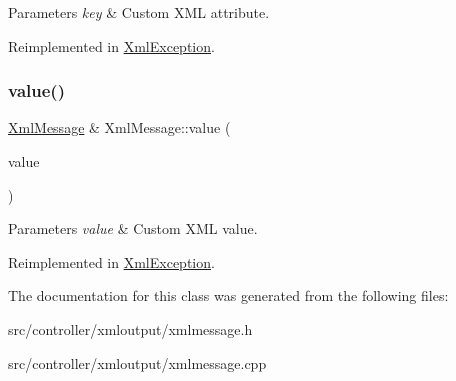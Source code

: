 \begin{DoxyParams}{Parameters}
{\em key} & Custom X\+ML attribute. \\
\hline
\end{DoxyParams}


Reimplemented in \hyperlink{classXmlException_a6a357f5a13ec354b84fb17ca5b5003a0}{Xml\+Exception}.

\mbox{\label{classXmlMessage_aef54b1b878c75f170139d1885597cb63}} 
\subsubsection{\texorpdfstring{value()}{value()}}
{\footnotesize\ttfamily \hyperlink{classXmlMessage}{Xml\+Message} \& Xml\+Message\+::value (\begin{DoxyParamCaption}\item[{const Q\+String \&}]{value }\end{DoxyParamCaption})\hspace{0.3cm}{\ttfamily [virtual]}}


\begin{DoxyParams}{Parameters}
{\em value} & Custom X\+ML value. \\
\hline
\end{DoxyParams}


Reimplemented in \hyperlink{classXmlException_ae51cb72a2a9db85e12409c5e3408ea4d}{Xml\+Exception}.



The documentation for this class was generated from the following files\+:\begin{DoxyCompactItemize}
\item 
src/controller/xmloutput/xmlmessage.\+h\item 
src/controller/xmloutput/xmlmessage.\+cpp\end{DoxyCompactItemize}

